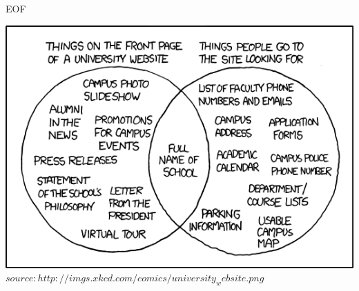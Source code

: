 	
	



		
	\begin{frame} {EOF}
		\begin{center}
			\includegraphics[scale=0.5]{graphics/02/eof2.png}\\
			\tiny $source: http://imgs.xkcd.com/comics/university_website.png$
		\end{center}
	\end{frame}


